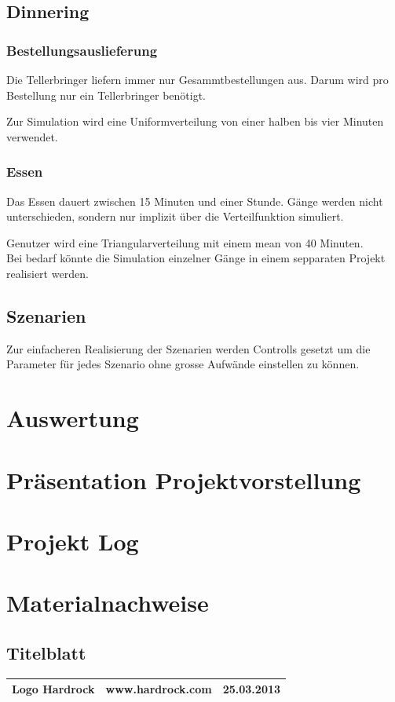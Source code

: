 \documentclass[ngerman,a4paper,12pt]{scrreprt}
\begin{document}
			
	\section{Dinnering}
		\subsection{Bestellungsauslieferung}					
			Die Tellerbringer liefern immer nur Gesammtbestellungen aus. Darum wird pro Bestellung nur ein Tellerbringer benötigt.
			
			Zur Simulation wird eine Uniformverteilung von einer halben bis vier Minuten verwendet.


		\subsection{Essen}
			Das Essen dauert zwischen 15 Minuten und einer Stunde. Gänge werden nicht unterschieden, sondern nur implizit über die Verteilfunktion simuliert.
			
			Genutzer wird eine Triangularverteilung mit einem mean von 40 Minuten.\\
			
			
			Bei bedarf könnte die Simulation einzelner Gänge in einem sepparaten Projekt realisiert werden.
			
			
			
	\section{Szenarien}
		Zur einfacheren Realisierung der Szenarien werden Controlls gesetzt um die Parameter für jedes Szenario ohne grosse Aufwände einstellen zu können.		
			
			
			
			
			
			

\chapter{Auswertung}



\appendix
\chapter{Präsentation Projektvorstellung}


\listoffigures

\chapter{Projekt Log}


\chapter{Materialnachweise}
\section{Titelblatt}
\begin{tabularx}{\textwidth}{|Xlr|}
		\hline
		Logo Hardrock & www.hardrock.com & 25.03.2013 \\
		\hline
\end{tabularx}
\end{document}
